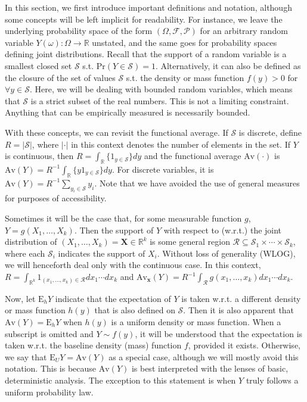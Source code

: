 \documentclass[12pt]{amsart}
\theoremstyle{plain}%
\theoremstyle{definition}
\theoremstyle{remark}
\numberwithin{equation}{section}
\begin{document}
In this section, we first introduce important definitions and notation, although some concepts will be left implicit for readability. For instance, we leave the underlying probability space of the form $(\Omega, \mathcal{F}, \mathcal{P})$ for an arbitrary random variable $Y(\omega): \Omega \to \mathbb{R}$ unstated, and the same goes for probability spaces defining joint distributions. Recall that the support of a random variable is a smallest closed set $\mathcal{S}$ s.t. $\text{Pr}(Y \in \mathcal{S}) = 1$. Alternatively, it can also be defined as the closure of the set of values $\mathcal{S}$ s.t. the density or mass function $f(y) > 0$ for $\forall y \in \mathcal{S}$. Here, we will be dealing with bounded random variables, which means that $\mathcal{S}$ is a strict subset of the real numbers. This is not a limiting constraint. Anything that can be empirically measured is necessarily bounded.

With these concepts, we can revisit the functional average. If $\mathcal{S}$ is discrete, define $R = |\mathcal{S}|$, where $|\cdot|$ in this context denotes the number of elements in the set. If $Y$ is continuous, then $R = \int_{\mathbb{R}} \{ 1_{y \in \mathcal{S}} \} dy$ and the functional average $\text{Av}(\cdot)$ is $\text{Av}(Y) = R^{-1} \int_{\mathbb{R}} \{ y 1_{y \in \mathcal{S}} \} dy$. For discrete variables, it is $\text{Av}(Y) = R^{-1} \sum_{y_i \in \mathcal{S}} y_i$. Note that we have avoided the use of general measures for purposes of accessibility.

Sometimes it will be the case that, for some measurable function $g$, $Y = g(X_1, \ldots, X_k)$. Then the support of $Y$ with respect to (w.r.t.) the joint distribution of $(X_1, \ldots, X_k) = \mathbf{X} \in \mathbb{R}^k$ is some general region $\mathcal{R} \subseteq \mathcal{S}_1 \times \cdots \times \mathcal{S}_k$, where each $\mathcal{S}_i$ indicates the support of $X_i$. Without loss of generality (WLOG), we will henceforth deal only with the continuous case. In this context, $R = \int_{\mathbb{R}^k} 1_{(x_1, \ldots, x_k) \in \mathcal{R}} dx_1 \cdots dx_k$ and $\text{Av}_{\mathbf{x}}(Y) = R^{-1} \int_{\mathcal{R}} g(x_1, \ldots, x_k) dx_1 \cdots dx_k$.

Now, let $\text{E}_{h}Y$ indicate that the expectation of $Y$ is taken w.r.t. a different density or mass function $h(y)$ that is also defined on $\mathcal{S}$. Then it is also apparent that $\text{Av}(Y) = \text{E}_hY$ when $h(y)$ is a uniform density or mass function. When a subscript is omitted and $Y \sim f(y)$, it will be understood that the expectation is taken w.r.t. the baseline density (mass) function $f$, provided it exists. Otherwise, we say that $\text{E}_U Y = \text{Av}(Y)$ as a special case, although we will mostly avoid this notation. This is because $\text{Av}(Y)$ is best interpreted with the lenses of basic, deterministic analysis. The exception to this statement is when $Y$ truly follows a uniform probability law.
\end{document}
